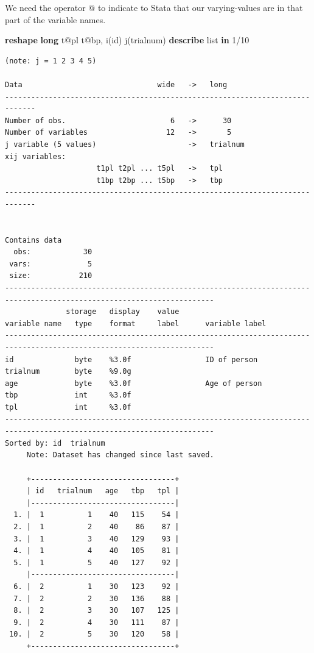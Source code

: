 \documentclass[
]{book}
\newenvironment{Shaded}{\begin{snugshade}}{\end{snugshade}}
\newcommand{\KeywordTok}[1]{\textcolor[rgb]{0.13,0.29,0.53}{\textbf{#1}}}
\newcommand{\NormalTok}[1]{#1}
\newcommand{\OtherTok}[1]{\textcolor[rgb]{0.56,0.35,0.01}{#1}}
\begin{document}
We need the operator @ to indicate to Stata that our varying-values are in
that part of the variable names.

\begin{Shaded}
\begin{Highlighting}[]
\KeywordTok{reshape} \KeywordTok{long}\NormalTok{ t@pl t@bp, i(id) j(trialnum)}
\KeywordTok{describe}
\OtherTok{list} \KeywordTok{in}\NormalTok{ 1/10}
\end{Highlighting}
\end{Shaded}

\begin{verbatim}
(note: j = 1 2 3 4 5)

Data                               wide   ->   long
-----------------------------------------------------------------------------
Number of obs.                        6   ->      30
Number of variables                  12   ->       5
j variable (5 values)                     ->   trialnum
xij variables:
                     t1pl t2pl ... t5pl   ->   tpl
                     t1bp t2bp ... t5bp   ->   tbp
-----------------------------------------------------------------------------


Contains data
  obs:            30                          
 vars:             5                          
 size:           210                          
----------------------------------------------------------------------------------------------------------------------
              storage   display    value
variable name   type    format     label      variable label
----------------------------------------------------------------------------------------------------------------------
id              byte    %3.0f                 ID of person
trialnum        byte    %9.0g                 
age             byte    %3.0f                 Age of person
tbp             int     %3.0f                 
tpl             int     %3.0f                 
----------------------------------------------------------------------------------------------------------------------
Sorted by: id  trialnum
     Note: Dataset has changed since last saved.

     +---------------------------------+
     | id   trialnum   age   tbp   tpl |
     |---------------------------------|
  1. |  1          1    40   115    54 |
  2. |  1          2    40    86    87 |
  3. |  1          3    40   129    93 |
  4. |  1          4    40   105    81 |
  5. |  1          5    40   127    92 |
     |---------------------------------|
  6. |  2          1    30   123    92 |
  7. |  2          2    30   136    88 |
  8. |  2          3    30   107   125 |
  9. |  2          4    30   111    87 |
 10. |  2          5    30   120    58 |
     +---------------------------------+
\end{verbatim}
\end{document}
